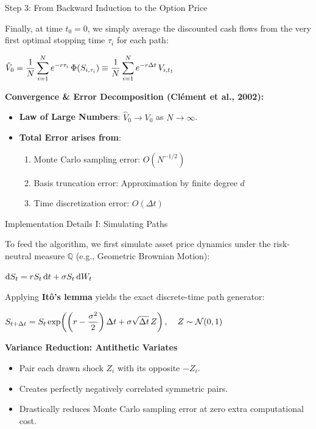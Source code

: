 \documentclass[10pt,aspectratio=169]{beamer}
\newcommand{\highlighteq}[1]{%
  \begin{center}
    \vspace{-0.1cm}
    \begin{tcolorbox}[
      colback=boxBg, colframe=mathGold, 
      boxrule=1.5pt, arc=2pt,
      top=4pt, bottom=4pt, left=4pt, right=4pt,
      width=0.95\linewidth, 
      halign=center, nobeforeafter
    ]
      $\displaystyle \fontsize{11}{14}\selectfont #1$
    \end{tcolorbox}
    \vspace{-0.1cm}
  \end{center}
}
\newcommand{\eqbox}[1]{%
  \begin{center}
    \vspace{-0.1cm}
    \begin{tcolorbox}[
      colback=white, colframe=mathBlue, 
      boxrule=1.0pt, arc=2pt,
      top=4pt, bottom=4pt, left=4pt, right=4pt,
      width=0.9\linewidth, 
      halign=center, nobeforeafter
    ]
      $\displaystyle \fontsize{10}{13}\selectfont #1$
    \end{tcolorbox}
    \vspace{-0.1cm}
  \end{center}
}
\newcommand{\Q}{\mathbb{Q}}
\newcommand{\de}{\mathrm{d}}
\begin{document}
\begin{frame}{Step 3: From Backward Induction to the Option Price}

Finally, at time $t_0 = 0$, we simply average the discounted cash flows from the very first optimal stopping time $\tau_i$ for each path:

\vspace{0.2cm}
\highlighteq{
  \hat{V}_0 = \frac{1}{N}\sum_{i=1}^{N} e^{-r\tau_i}\, \Phi(S_{i,\tau_i}) \equiv \frac{1}{N}\sum_{i=1}^{N} e^{-r\Delta t}\, V_{i,t_1}
}

\vspace{0.4cm}
\textbf{Convergence \& Error Decomposition (Clément et al., 2002):}
\begin{itemize}
    \item \textbf{Law of Large Numbers}: $\hat{V}_0 \to V_0$ as $N \to \infty$.
    \item \textbf{Total Error arises from}: 
    \begin{enumerate}
        \item Monte Carlo sampling error: $O(N^{-1/2})$
        \item Basis truncation error: Approximation by finite degree $d$
        \item Time discretization error: $O(\Delta t)$
    \end{enumerate}
\end{itemize}
\end{frame}

\begin{frame}{Implementation Details I: Simulating Paths}

To feed the algorithm, we first simulate asset price dynamics under the risk-neutral measure $\Q$ (e.g., Geometric Brownian Motion):
\eqbox{
  \de S_t = r S_t\,\de t + \sigma S_t\,\de W_t
}

\vspace{0.1cm}
Applying \textbf{It\^o's lemma} yields the exact discrete-time path generator:
\highlighteq{
  S_{t+\Delta t} = S_t \exp\!\left(\left(r - \frac{\sigma^2}{2}\right)\Delta t + \sigma\sqrt{\Delta t}\,Z\right), \quad Z \sim \mathcal{N}(0,1)
}

\vspace{0.2cm}
\textbf{Variance Reduction: Antithetic Variates}
\begin{itemize}
    \item Pair each drawn shock $Z_i$ with its opposite $-Z_i$.
    \item Creates perfectly negatively correlated symmetric pairs.
    \item Drastically reduces Monte Carlo sampling error at zero extra computational cost.
\end{itemize}
\end{frame}
\end{document}
